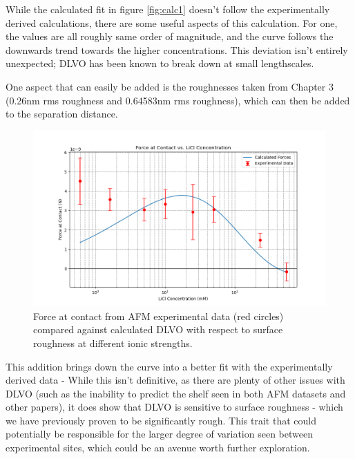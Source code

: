 While the calculated fit in figure \ref{fig:calc1} doesn't follow the experimentally derived calculations, there are some useful aspects of this calculation. For one, the values are all roughly same order of magnitude, and the curve follows the downwards trend towards the higher concentrations. This deviation isn't entirely unexpected; DLVO has been known to break down at small lengthscales. \cite{Horinek2014}

One aspect that can easily be added is the roughnesses taken from Chapter 3 (0.26nm rms roughness and 0.64583nm rms roughness), which can then be added to the separation distance.

\begin{figure}[h!]
\centering
\includegraphics[width=\textwidth]{chapter8/Calculated/roughness.png}
\caption{Force at contact from AFM experimental data (red circles) compared against calculated DLVO with respect to surface roughness at different ionic strengths.}
\label{fig:calc2}
\end{figure}

This addition brings down the curve into a better fit with the experimentally derived data - While this isn't definitive, as there are plenty of other issues with DLVO (such as the inability to predict the shelf seen in both AFM datasets and other papers), it does show that DLVO is sensitive to surface roughness - which we have previously proven to be significantly rough. This trait that could potentially be responsible for the larger degree of variation seen between experimental sites, which could be an avenue worth further exploration.


